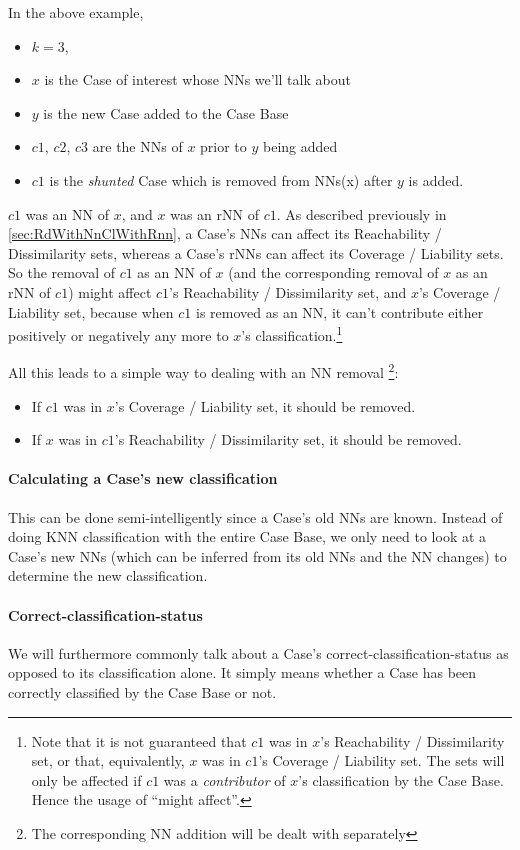 \documentclass[a4paper,11pt]{report}
\begin{document}
In the above example,
\begin{itemize}
	\item $k=3$, 
	\item $x$ is the Case of interest whose NNs  we'll talk about
	\item $y$ is the new Case added to the Case Base
	\item $c1$, $c2$, $c3$ are the NNs of $x$ prior to $y$ being added
	\item $c1$ is the \emph{shunted} Case which is removed from NNs(x) after $y$ is added.
\end{itemize}

$c1$ was an NN of $x$, and $x$ was an rNN of $c1$. As described previously in \ref{sec:RdWithNnClWithRnn}, a Case's NNs can affect its Reachability / Dissimilarity sets, whereas a Case's rNNs can affect its Coverage / Liability sets. So the removal of $c1$ as an NN of $x$ (and the corresponding removal of $x$ as an rNN of $c1$) might affect $c1$'s Reachability / Dissimilarity set, and $x$'s Coverage / Liability set, because when $c1$ is removed as an NN, it can't contribute either positively or negatively any more to $x$'s classification.\footnote{Note that it is not guaranteed that $c1$ was in $x$'s Reachability / Dissimilarity set, or that, equivalently, $x$ was in $c1$'s Coverage / Liability set. The sets will only be affected if $c1$ was a \emph{contributor} of $x$'s classification by the Case Base. Hence the usage of ``might affect''.}

All this leads to a simple way to dealing with an NN removal \footnote{The corresponding NN addition will be dealt with separately}:
\begin{itemize}
	\item If $c1$ was in $x$'s Coverage / Liability set, it should be removed.
	\item If $x$ was in $c1$'s Reachability / Dissimilarity set, it should be removed.
\end{itemize}

\paragraph{Calculating a Case's new classification}
This can be done semi-intelligently since a Case's old NNs are known. Instead of doing KNN classification with the entire Case Base, we only need to look at a Case's new NNs (which can be inferred from its old NNs and the NN changes) to determine the new classification.

\paragraph{Correct-classification-status}
We will furthermore commonly talk about a Case's correct-classification-status as opposed to its classification alone. It simply means whether a Case has been correctly classified by the Case Base or not. 
\end{document}
